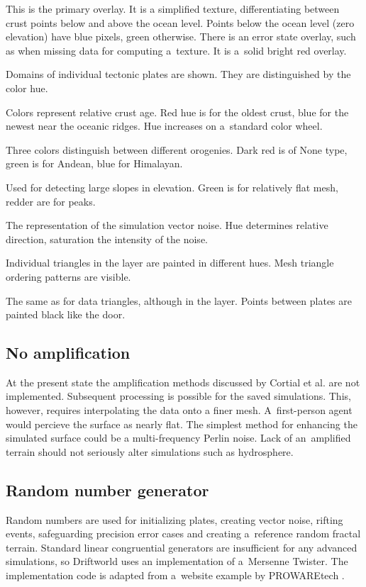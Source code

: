 \begin{itemize}[\label={}]
\item[\textbf{Basic terrain}] This is the primary overlay. It is a simplified texture, differentiating between crust points below and above the ocean level. Points below the ocean level (zero elevation) have blue pixels, green otherwise. There is an error state overlay, such as when missing data for computing a~texture. It is a~solid bright red overlay.
\item[\textbf{Crust plates}] Domains of individual tectonic plates are shown. They are distinguished by the color hue.
\item[\textbf{Crust age}] Colors represent relative crust age. Red hue is for the oldest crust, blue for the newest near the oceanic ridges. Hue increases on a~standard color wheel.
\item[\textbf{Orogeny}] Three colors distinguish between different orogenies. Dark red is of None type, green is for Andean, blue for Himalayan.
\item[\textbf{Elevation Laplacian}] Used for detecting large slopes in elevation. Green is for relatively flat mesh, redder are for peaks.
\item[\textbf{Vector noise}] The representation of the simulation vector noise. Hue determines relative direction, saturation the intensity of the noise.
\item[\textbf{Debug data triangles}] Individual triangles in the  layer are painted in different hues. Mesh triangle ordering patterns are visible.
\item[\textbf{Debug crust triangles}] The same as for data triangles, although in the  layer. Points between plates are painted black like the door.
\end{itemize}
\subsection{No amplification}
At the present state the amplification methods discussed by Cortial et al. are not implemented. Subsequent processing is possible for the saved simulations. This, however, requires interpolating the data onto a finer mesh. A~first-person agent would percieve the surface as nearly flat. The simplest method for enhancing the simulated surface could be a multi-frequency Perlin noise. Lack of an~amplified terrain should not seriously alter simulations such as hydrosphere.
\subsection{Random number generator}
Random numbers are used for initializing plates, creating vector noise, rifting events, safeguarding precision error cases and creating a~reference random fractal terrain. Standard linear congruential generators are insufficient for any advanced simulations, so Driftworld uses an implementation of a~Mersenne Twister. The implementation code is adapted from a~website example by PROWAREtech \cite{prowaretech}.

